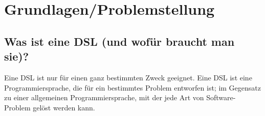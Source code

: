 
\chapter{Grundlagen/Problemstellung}\label{chp:grundlagen}

\section{Was ist eine DSL (und wofür braucht man sie)?}\label{sct:dsldef}
Eine DSL ist nur für einen ganz bestimmten Zweck geeignet\cite{book:fowlerDSL}.
Eine DSL ist eine Programmiersprache, die für ein bestimmtes Problem entworfen ist; im Gegensatz zu einer allgemeinen Programmiersprache, mit der jede
Art von Software-Problem gelöst werden kann\cite{www:fowlerDSL}.